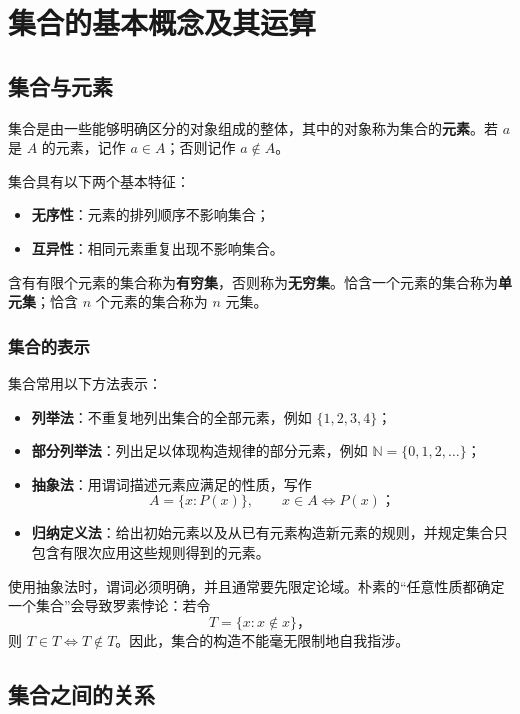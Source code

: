 \section{集合的基本概念及其运算}

\subsection{集合与元素}

集合是由一些能够明确区分的对象组成的整体，其中的对象称为集合的\textbf{元素}。若 $a$ 是 $A$ 的元素，记作 $a \in A$；否则记作 $a \notin A$。

集合具有以下两个基本特征：

\begin{itemize}
	\item \textbf{无序性}：元素的排列顺序不影响集合；
	\item \textbf{互异性}：相同元素重复出现不影响集合。
\end{itemize}

含有有限个元素的集合称为\textbf{有穷集}，否则称为\textbf{无穷集}。恰含一个元素的集合称为\textbf{单元集}；恰含 $n$ 个元素的集合称为 $n$ 元集。

\subsubsection{集合的表示}

集合常用以下方法表示：

\begin{itemize}
	\item \textbf{列举法}：不重复地列出集合的全部元素，例如 $\{1, 2, 3, 4\}$；
	\item \textbf{部分列举法}：列出足以体现构造规律的部分元素，例如 $\mathbb{N} = \{0, 1, 2, \dots\}$；
	\item \textbf{抽象法}：用谓词描述元素应满足的性质，写作
	$$
	A = \{x: P(x)\}, \qquad x \in A \iff P(x)；
	$$
	\item \textbf{归纳定义法}：给出初始元素以及从已有元素构造新元素的规则，并规定集合只包含有限次应用这些规则得到的元素。
\end{itemize}

使用抽象法时，谓词必须明确，并且通常要先限定论域。朴素的“任意性质都确定一个集合”会导致罗素悖论：若令
$$
T = \{x: x \notin x\}，
$$
则 $T \in T \iff T \notin T$。因此，集合的构造不能毫无限制地自我指涉。

\subsection{集合之间的关系}

